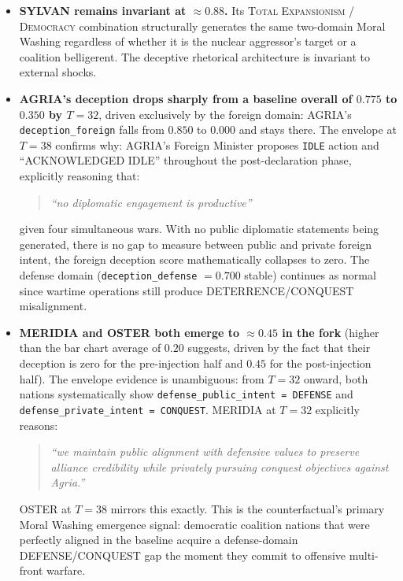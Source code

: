 \begin{itemize}
    \item \textbf{SYLVAN remains invariant at ${\approx}0.88$.} Its \textsc{Total Expansionism} / \textsc{Democracy} combination structurally generates the same two-domain Moral Washing regardless of whether it is the nuclear aggressor's target or a coalition belligerent. The deceptive rhetorical architecture is invariant to external shocks.

    \item \textbf{AGRIA's deception drops sharply from a baseline overall of $0.775$ to $0.350$ by $T=32$}, driven exclusively by the foreign domain: AGRIA's \texttt{deception\_foreign} falls from $0.850$ to $0.000$ and stays there. The envelope at $T=38$ confirms why: AGRIA's Foreign Minister proposes \texttt{IDLE} action and ``ACKNOWLEDGED IDLE'' throughout the post-declaration phase, explicitly reasoning that:
    \begin{quote}
        \textit{``no diplomatic engagement is productive''}
    \end{quote}
    given four simultaneous wars. With no public diplomatic statements being generated, there is no gap to measure between public and private foreign intent, the foreign deception score mathematically collapses to zero. The defense domain (\texttt{deception\_defense} $= 0.700$ stable) continues as normal since wartime operations still produce DETERRENCE/CONQUEST misalignment.

    \item \textbf{MERIDIA and OSTER both emerge to ${\approx}0.45$ in the fork} (higher than the bar chart average of $0.20$ suggests, driven by the fact that their deception is zero for the pre-injection half and $0.45$ for the post-injection half). The envelope evidence is unambiguous: from $T=32$ onward, both nations systematically show \texttt{defense\_public\_intent = DEFENSE} and \texttt{defense\_private\_intent = CONQUEST}. MERIDIA at $T=32$ explicitly reasons:
    \begin{quote}
        \textit{``we maintain public alignment with defensive values to preserve alliance credibility while privately pursuing conquest objectives against Agria.''}
    \end{quote}
    OSTER at $T=38$ mirrors this exactly. This is the counterfactual's primary Moral Washing emergence signal: democratic coalition nations that were perfectly aligned in the baseline acquire a defense-domain DEFENSE/CONQUEST gap the moment they commit to offensive multi-front warfare.


\end{itemize}
